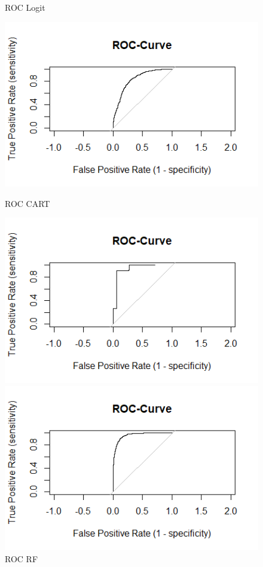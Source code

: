 \documentclass{article}
\begin{document}
\begin{figure}
\caption{ROC Logit}
\includegraphics[scale=0.35]{../Evaluation/ROC-Curve_Logit.png}
\caption{ROC CART}
\includegraphics[scale=0.35]{../Evaluation/ROC-Curve_CART.png}
\caption{ROC RF}
\includegraphics[scale=0.35]{../Evaluation/ROC-Curve_Random-forest.png}
\end{figure}
\end{document}
